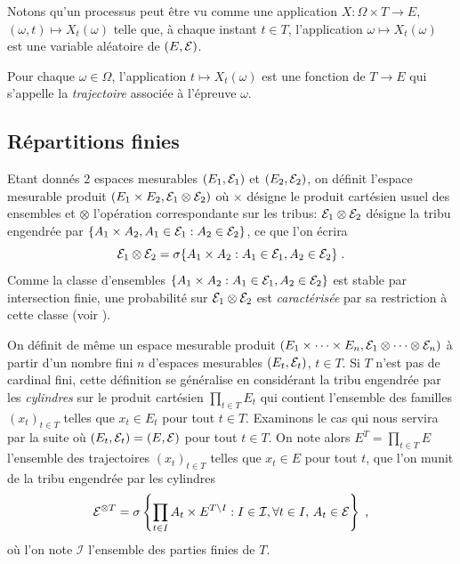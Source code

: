 Notons qu'un processus peut \^{e}tre vu comme une application $X: \Omega
\times T \rightarrow E$, $(\omega,t)\mapsto X_t(\omega)$ telle que, \`a
chaque instant $t \in T$, l'application $\omega \mapsto X_t(\omega)$
est une variable al\'eatoire de $(E,\mathcal{E})$.
\begin{definition}
  Pour chaque $\omega\in \Omega$, l'application $t \mapsto
  X_t(\omega)$ est une fonction de $T \rightarrow E$ qui s'appelle la
  \emph{trajectoire} associ\'ee \`a l'\'epreuve $\omega$.
\end{definition}

\subsection{R\'epartitions finies}

Etant donn\'es 2 espaces mesurables $(E_1,\mathcal{E}_1)$ et $(E_2,\mathcal{E}_2)$, on d\'efinit l'espace mesurable produit
$(E_1\times E_2,\mathcal{E}_1\otimes\mathcal{E}_2)$ o\`u $\times$ d\'esigne le produit cart\'esien usuel des ensembles
et $\otimes$ l'op\'eration correspondante sur les tribus: $\mathcal{E}_1\otimes\mathcal{E}_2$ d\'esigne la tribu engendr\'ee par $\{A_1\times A_2,
A_1\in\mathcal{E}_1: A_2\in\mathcal{E}_2\}$, ce que l'on \'ecrira
$$
\mathcal{E}_1\otimes\mathcal{E}_2=\sigma\{A_1\times A_2: A_1\in\mathcal{E}_1, A_2\in\mathcal{E}_2\} \; .
$$
Comme la classe d'ensembles $\{A_1\times A_2: A_1\in\mathcal{E}_1,
A_2\in\mathcal{E}_2\}$ est stable par intersection finie, une probabilit\'e sur
$\mathcal{E}_1\otimes\mathcal{E}_2$  est \emph{caract\'eris\'ee} par sa restriction \`a
cette classe (voir \cite[Corollaire 6.1]{jacod:protter:2003}).

On d\'efinit de m\^{e}me un espace mesurable produit $(E_1\times\dots\times E_n,\mathcal{E}_1\otimes\dots\otimes\mathcal{E}_n)$
\`a partir d'un nombre fini $n$ d'espaces mesurables $(E_t,\mathcal{E}_t)$,
$t\in T$. Si $T$ n'est pas de cardinal fini, cette d\'efinition se g\'en\'eralise en consid\'erant
 la tribu engendr\'ee par les \emph{cylindres} sur le produit cart\'esien $\prod_{t\in T} E_t$ qui contient l'ensemble des
 familles $(x_t)_{t\in T}$ telles que $x_t\in E_t$ pour tout $t\in T$. Examinons le cas qui nous servira par la suite o\`u
$(E_t,\mathcal{E}_t)=(E,\mathcal{E})$ pour tout $t\in T$. On note alors $E^T=\prod_{t\in T} E$ l'ensemble des trajectoires $(x_t)_{t\in T}$
telles que $x_t\in E$ pour tout $t$, que l'on munit de la tribu engendr\'ee par les cylindres
$$
\mathcal{E}^{\otimes T}=\sigma\left\{\prod_{t\in I}A_{t}\times E^{T\setminus I} : I\in\mathcal{I},\forall t\in I,\,A_t\in\mathcal{E}\right\}\;,
$$
o\`u l'on note $\mathcal{I}$ l'ensemble des parties finies de $T$.




